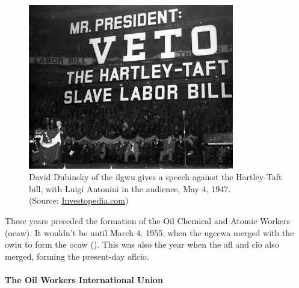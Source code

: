 \documentclass[12pt]{article}
\newcommand{\imageWidth}{0.8\textwidth}
\begin{document}
\begin{figure}[ht]
  \centering
  \includegraphics[width=\imageWidth]{images/slave_labor_bill}
  \captionsetup{justification=centering, singlelinecheck=false, margin=2cm} 
  \caption[Anti-Hartley-Taft Rally]{David Dubinsky of the \acrfull{ilgwu} gives a speech against the Hartley-Taft bill, with Luigi Antonini in the audience, May 4, 1947.\\ (Source: \href{https://www.investopedia.com/thmb/VcswppMRTl8IqMbgLRqdigfIGvs=/1500x0/filters:no_upscale():max_bytes(150000):strip_icc()/5278798677_0429e6aa05_k-7b6b81bdbbe44cdb929c08c7da9f8d29.jpg}{Investopedia.com}) \nocite{investopediaMrPresidentVeto}}
  \label{fig:slave_labor_bill}
\end{figure}

These years preceded the formation of the Oil Chemical and Atomic Workers (\acrshort{ocaw}). It wouldn’t be until March 4, 1955, when the \acrfull{ugccwa} merged with the \acrfull{owiu} to form the \acrshort{ocaw} (\cite[48]{ocawFactBookOil1960}). This was also the year when the \acrshort{afl} and \acrshort{cio} also merged, forming the present-day \acrfull{aflcio}.

\paragraph{The Oil Workers International Union}
\end{document}
